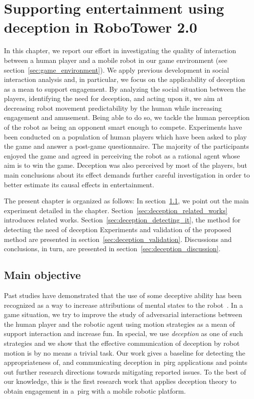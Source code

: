 \chapter{Supporting entertainment using deception in RoboTower 2.0}\label{ch:deception}

In this chapter, we report our effort in investigating the quality of interaction between a human player and a mobile robot in our game environment (see section~\ref{sec:game_environment}). We apply previous development in social interaction analysis and, in particular, we focus on the applicability of deception as a mean to support engagement. By analyzing the social situation between the players, identifying the need for deception, and acting upon it, we aim at decreasing robot movement predictability by the human while increasing engagement and amusement. Being able to do so, we tackle the human perception of the robot as being an opponent smart enough to compete. Experiments have been conducted on a population of human players which have been asked to play the game and answer a post-game questionnaire. The majority of the participants enjoyed the game and agreed in perceiving the robot as a rational agent whose aim is to win the game. Deception was also perceived by most of the players, but main conclusions about its effect demands further careful investigation in order to better estimate its causal effects in entertainment.

The present chapter is organized as follows: In section~\ref{sec:deception_main_objectives}, we point out the main experiment detailed in the chapter. Section~\ref{sec:deception_related_works} introduces related works. Section~\ref{sec:deception_detecting_it}, the method for detecting the need of deception%
Experiments and validation of the proposed method are presented in section~\ref{sec:deception_validation}. Discussions and conclusions, in turn, are presented in section~\ref{sec:deception_discussion}.

\section{Main objective}\label{sec:deception_main_objectives}

Past studies have demonstrated that the use of some deceptive ability has been recognized as a way to increase attributions of mental states to the robot~\citep{shim_taxonomy_2013}. In a game situation, we try to improve the study of adversarial interactions between the human player and the robotic agent using motion strategies as a mean of support interaction and increase fun. In special, we use \textit{deception} as one of such strategies and we show that the effective communication of deception by robot motion is by no means a trivial task. Our work gives a baseline for detecting the appropriateness of, and communicating deception in~\gls{pirg} applications and points out further research directions towards mitigating reported issues. To the best of our knowledge, this is the first research work that applies deception theory to obtain engagement in a~\gls{pirg} with a mobile robotic platform.

